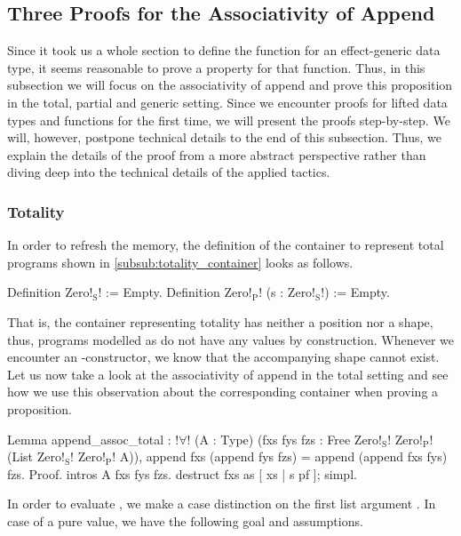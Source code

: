\subsection{Three Proofs for the Associativity of Append}

Since it took us a whole section to define the function  for an effect\--generic  data type, it seems reasonable to prove a property for that function.
Thus, in this subsection we will focus on the associativity of append and prove this proposition in the total, partial and generic setting.
Since we encounter proofs for lifted data types and functions for the first time, we will present the proofs step\--by\--step.
We will, however, postpone technical details to the end of this subsection.
Thus, we explain the details of the proof from a more abstract perspective rather than diving deep into the technical details of the applied tactics.

\subsubsection{Totality}
In order to refresh the memory, the definition of the container to represent total programs shown in \autoref{subsub:totality_container} looks as follows.

\begin{coqcode}
Definition Zero!$_\text{S}$! := Empty.
Definition Zero!$_\text{P}$! (s : Zero!$_\text{S}$!) := Empty.
\end{coqcode}

That is, the container representing totality has neither a position nor a shape, thus, programs modelled as  do not have any  values by construction.
Whenever we encounter an \--constructor, we know that the accompanying shape  cannot exist.
Let us now take a look at the associativity of append in the total setting and see how we use this observation about the corresponding container when proving a proposition.

\begin{coqcode}
Lemma append_assoc_total :
 !$\forall$! (A : Type) (fxs fys fzs : Free Zero!$_\text{S}$! Zero!$_\text{P}$! (List Zero!$_\text{S}$! Zero!$_\text{P}$! A)),
   append fxs (append fys fzs) = append (append fxs fys) fzs.
Proof.
 intros A fxs fys fzs.
 destruct fxs as [ xs | s pf ]; simpl.
\end{coqcode}

In order to evaluate , we make a case distinction on the first list argument .
In case of a pure value, we have the following goal and assumptions.


